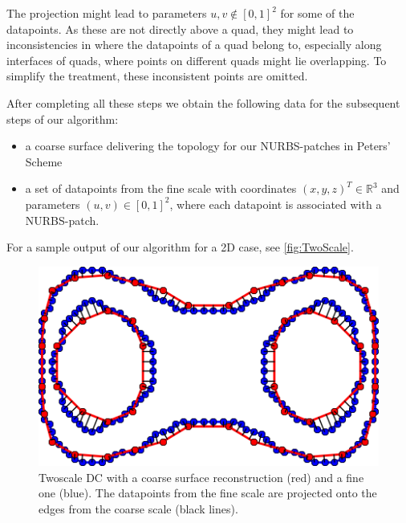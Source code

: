 The projection might lead to parameters $u,v\not\in\left[0,1\right]^2$ for some of the datapoints. As these are not directly above a \ac{quad}, they might lead to inconsistencies in where the datapoints of a quad belong to, especially along interfaces of quads, where points on different quads might lie overlapping. To simplify the treatment, these inconsistent points are omitted.

After completing all these steps we obtain the following data for the subsequent steps of our algorithm:
\begin{itemize}
\item a coarse surface delivering the topology for our \ac{NURBS}-patches in Peters' Scheme
\item a set of datapoints from the fine scale with coordinates $\left(x,y,z\right)^T\in\mathbb{R}^3$ and parameters $\left(u,v\right)\in\left[0,1\right]^2$, where each datapoint is associated with a \ac{NURBS}-patch. 
\end{itemize}
For a sample output of our algorithm for a 2D case, see \autoref{fig:TwoScale}.

\begin{figure}
\begin{center}
\includegraphics[width=.5 \textwidth]{Pictures/SurfaceReconstruction/TwoScale}
\caption{Twoscale \acl{DC} with a coarse surface reconstruction (red) and a fine one (blue). The datapoints from the fine scale are projected onto the edges from the coarse scale (black lines).}
\label{fig:TwoScale}
\end{center}
\end{figure}

